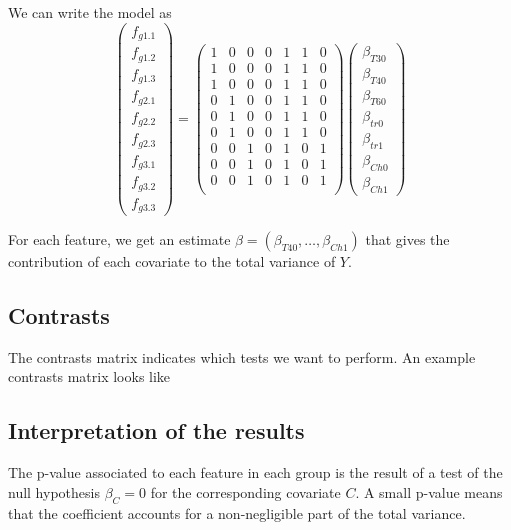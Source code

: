 \documentclass[a4paper,11pt]{article}
\begin{document}
We can write the model as 
$$ 
\begin{pmatrix} 
f_{g1.1} \\ f_{g1.2} \\ f_{g1.3} \\ f_{g2.1} \\ f_{g2.2} \\ f_{g2.3} \\ f_{g3.1} \\ f_{g3.2} \\ f_{g3.3}
\end{pmatrix}
=
\begin{pmatrix}
1 & 0 & 0 & 0 & 1 & 1 & 0 \\
1 & 0 & 0 & 0 & 1 & 1 & 0 \\
1 & 0 & 0 & 0 & 1 & 1 & 0 \\
0 & 1 & 0 & 0 & 1 & 1 & 0 \\
0 & 1 & 0 & 0 & 1 & 1 & 0 \\
0 & 1 & 0 & 0 & 1 & 1 & 0 \\
0 & 0 & 1 & 0 & 1 & 0 & 1 \\
0 & 0 & 1 & 0 & 1 & 0 & 1 \\
0 & 0 & 1 & 0 & 1 & 0 & 1 \\
\end{pmatrix}
\begin{pmatrix}
\beta_{T30} \\ \beta_{T40} \\ \beta_{T60} \\ \beta_{tr0} \\ \beta_{tr1} \\ \beta_{Ch0} \\ \beta_{Ch1}
\end{pmatrix}	
$$

For each feature, we get an estimate $\beta = (\beta_{T40},\ldots,\beta_{Ch1})$ that gives the contribution of each covariate to the total variance of $Y$.

\subsection{Contrasts}
The contrasts matrix indicates which tests we want to perform. An example contrasts matrix looks like
$$  $$

\subsection{Interpretation of the results}
The p-value associated to each feature in each group is the result of a test of the null hypothesis $\beta_C=0$ for the corresponding covariate $C$. A small p-value means that the coefficient accounts for a non-negligible part of the total variance.
\end{document}
